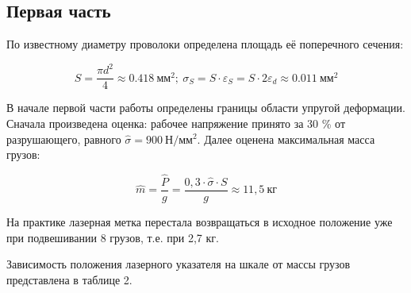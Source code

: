 \documentclass{article}
\begin{document}
\subsection*{Первая часть} 

По известному диаметру проволоки определена площадь её поперечного сечения:

\begin{equation}
	S = \frac{\pi d^{2}}{4} \approx 0.418 \ {мм}^{2} ; \ \sigma_S = S \cdot \varepsilon_S = S  \cdot 2 \varepsilon_d \approx 0.011 \ {мм}^{2}
\end{equation}

В начале первой части работы определены границы области упругой деформации. Сначала произведена оценка: рабочее напряжение принято за 30 \% от разрушающего, равного $ \hat{\sigma} = 900 \ Н/мм^{2}$. Далее оценена максимальная масса грузов:

\begin{equation}
	\hat{m} = \frac{\hat{P}}{g} = \frac{0,3\cdot \hat{\sigma} \cdot S}{g} \approx 11,5 \ кг
\end{equation}

На практике лазерная метка перестала возвращаться в исходное положение уже при подвешивании 8 грузов, т.е. при 2,7 кг.

Зависимость положения лазерного указателя на шкале от массы грузов представлена в таблице 2.

\begin{table}[h!]
	\centering
\end{table}
\end{document}
